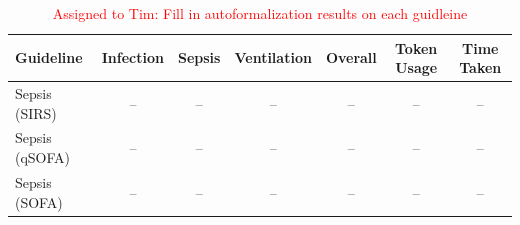 \begin{table}
\centering
\begin{tabular}{lcccccc}
\toprule
Guideline & Infection & Sepsis & Ventilation & Overall & Token Usage & Time Taken \\
\midrule
Sepsis (SIRS) & -- & -- & -- & -- & -- & -- \\
Sepsis (qSOFA) & -- & -- & -- & -- & -- & -- \\
Sepsis (SOFA) & -- & -- & -- & -- & -- & -- \\
\bottomrule
\end{tabular}
\caption{\textcolor{red}{Assigned to Tim: Fill in autoformalization results on each guidleine}}
\label{tab:guideline_generalization}
\end{table}
